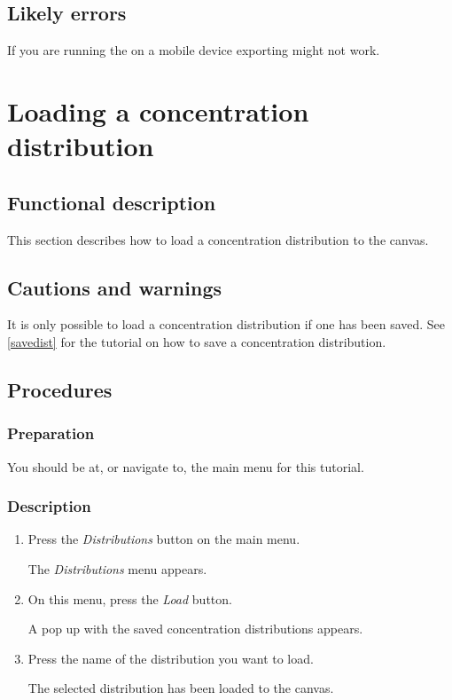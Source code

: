 \subsection{Likely errors}
If you are running the \applicationname on a mobile device exporting might not work.


\section{Loading a concentration distribution}
\label{sec:loadDist}

\subsection{Functional description}
This section describes how to load a concentration distribution to the canvas.

\subsection{Cautions and warnings}
It is only possible to load a concentration distribution if one has been saved. See \ref{savedist} for the tutorial on how to save a concentration distribution.

\subsection{Procedures}
\subsubsection{Preparation}
You should be at, or navigate to, the main menu for this tutorial.

\subsubsection{Description}
\begin{enumerate}
	\item Press the \emph{Distributions} button on the main menu.
		\begin{itemize}
            The \emph{Distributions} menu appears.
		\end{itemize}
	\item On this menu, press the \emph{Load} button.
		\begin{itemize}
             A pop up with the saved concentration distributions appears. 
		\end{itemize}
    \item Press the name of the distribution you want to load.
		\begin{itemize}
            The selected distribution has been loaded to the canvas.
		\end{itemize}
\end{enumerate}

